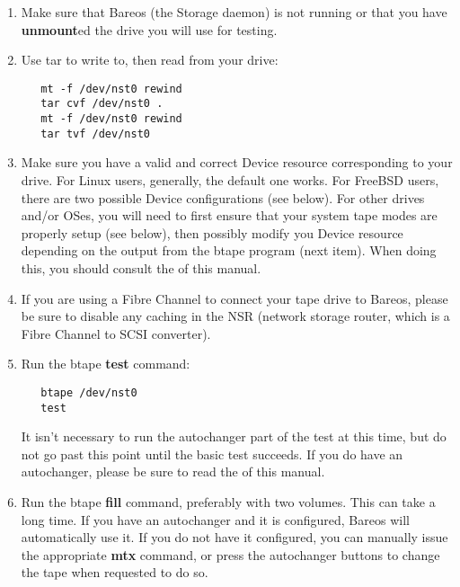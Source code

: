 \begin{enumerate}
\item Make sure that Bareos (the Storage daemon) is not running
  or that you have {\bf unmount}ed the drive you will use
  for testing.

\item Use tar to write to, then read from your drive:

   \footnotesize
\begin{verbatim}
   mt -f /dev/nst0 rewind
   tar cvf /dev/nst0 .
   mt -f /dev/nst0 rewind
   tar tvf /dev/nst0

\end{verbatim}
\normalsize

\item Make sure you have a valid and correct Device resource corresponding
   to your drive.  For Linux users, generally, the default one works.  For
   FreeBSD users, there are two possible Device configurations (see below).
   For other drives and/or OSes, you will need to first ensure that your
   system tape modes are properly setup (see below), then possibly modify
   you Device resource depending on the output from the btape program (next
   item). When doing this, you should consult the
    of this manual.

\item If you are using a Fibre Channel to connect your tape drive to
   Bareos, please be sure to disable any caching in the NSR (network
   storage router, which is a Fibre Channel to SCSI converter).

\item Run the btape {\bf test} command:

   \footnotesize
\begin{verbatim}
   btape /dev/nst0
   test
\end{verbatim}
\normalsize

   It isn't necessary to run the autochanger part of the test at this time,
   but do not go past this point until the basic test succeeds.  If you do
   have an autochanger, please be sure to read the
    of this manual.

\item Run the btape {\bf fill} command, preferably with two volumes.  This
   can take a long time. If you have an autochanger and it  is configured, Bareos
   will automatically use it. If you do  not have it configured, you can manually
   issue the appropriate  {\bf mtx} command, or press the autochanger buttons to
   change  the tape when requested to do so.


\end{enumerate}
